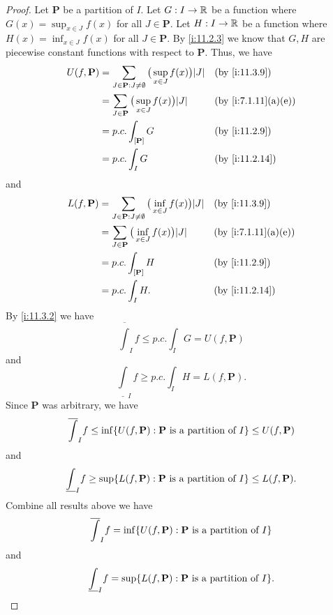\begin{proof}
  Let \(\mathbf{P}\) be a partition of \(I\).
  Let \(G : I \to \mathbb{R}\) be a function where \(G(x) = \sup_{x \in J} f(x)\) for all \(J \in \mathbf{P}\).
  Let \(H : I \to \mathbb{R}\) be a function where \(H(x) = \inf_{x \in J} f(x)\) for all \(J \in \mathbf{P}\).
  By \cref{i:11.2.3} we know that \(G, H\) are piecewise constant functions with respect to \(\mathbf{P}\).
  Thus, we have
  \begin{align*}
    U(f, \mathbf{P}) & = \sum_{J \in \mathbf{P} : J \neq \emptyset} \big(\sup_{x \in J} f(x)\big) \abs{J} &  & \by{i:11.3.9}      \\
                     & = \sum_{J \in \mathbf{P}} \big(\sup_{x \in J} f(x)\big) \abs{J}                    &  & \by{i:7.1.11}[a,e] \\
                     & = p.c. \int_{[\mathbf{P}]} G                                                       &  & \by{i:11.2.9}      \\
                     & = p.c. \int_I G                                                                    &  & \by{i:11.2.14}
  \end{align*}
  and
  \begin{align*}
    L(f, \mathbf{P}) & = \sum_{J \in \mathbf{P} : J \neq \emptyset} \big(\inf_{x \in J} f(x)\big) \abs{J} &  & \by{i:11.3.9}      \\
                     & = \sum_{J \in \mathbf{P}} \big(\inf_{x \in J} f(x)\big) \abs{J}                    &  & \by{i:7.1.11}[a,e] \\
                     & = p.c. \int_{[\mathbf{P}]} H                                                       &  & \by{i:11.2.9}      \\
                     & = p.c. \int_I H.                                                                   &  & \by{i:11.2.14}
  \end{align*}
  By \cref{i:11.3.2} we have
  \[
    \overline{\int}_I f \leq p.c. \int_I G = U(f, \mathbf{P})
  \]
  and
  \[
    \underline{\int}_I f \geq p.c. \int_I H = L(f, \mathbf{P}).
  \]
  Since \(\mathbf{P}\) was arbitrary, we have
  \[
    \overline{\int}_I f \leq \inf\set{U(f, \mathbf{P}) : \mathbf{P} \text{ is a partition of } I} \leq U(f, \mathbf{P})
  \]
  and
  \[
    \underline{\int}_I f \geq \sup\set{L(f, \mathbf{P}) : \mathbf{P} \text{ is a partition of } I} \leq L(f, \mathbf{P}).
  \]
  Combine all results above we have
  \[
    \overline{\int}_I f = \inf\set{U(f, \mathbf{P}) : \mathbf{P} \text{ is a partition of } I}
  \]
  and
  \[
    \underline{\int}_I f = \sup\set{L(f, \mathbf{P}) : \mathbf{P} \text{ is a partition of } I}.
  \]
\end{proof}


